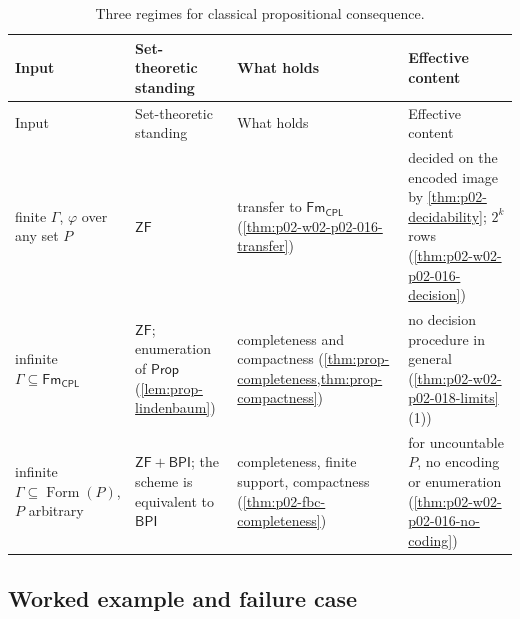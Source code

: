 \begingroup\small
\begin{longtable}{@{}p{}p{}p{}p{}@{}}
\caption{Three regimes for classical propositional consequence.}
\label{tab:p02-w02-p02-016-regimes}\\
\toprule
Input & Set-theoretic standing & What holds & Effective content \\
\midrule\endfirsthead
\toprule
Input & Set-theoretic standing & What holds & Effective content \\
\midrule\endhead
finite \(\Gamma\), \(\varphi\) over any set \(P\)
 & \(\mathsf{ZF}\)
 & transfer to \(\mathsf{Fm}_{\mathsf{CPL}}\)
   (\cref{thm:p02-w02-p02-016-transfer})
 & decided on the encoded image by \cref{thm:p02-decidability};
   \(2^k\) rows (\cref{thm:p02-w02-p02-016-decision}) \\
infinite \(\Gamma\subseteq\mathsf{Fm}_{\mathsf{CPL}}\)
 & \(\mathsf{ZF}\); enumeration of \(\mathsf{Prop}\)
   (\cref{lem:prop-lindenbaum})
 & completeness and compactness
   (\cref{thm:prop-completeness,thm:prop-compactness})
 & no decision procedure in general
   (\cref{thm:p02-w02-p02-018-limits}(1)) \\
infinite \(\Gamma\subseteq\operatorname{Form}(P)\), \(P\) arbitrary
 & \(\mathsf{ZF}+\mathsf{BPI}\); the scheme is equivalent to
   \(\mathsf{BPI}\)
 & completeness, finite support, compactness
   (\cref{thm:p02-fbc-completeness})
 & for uncountable \(P\), no encoding or enumeration
   (\cref{thm:p02-w02-p02-016-no-coding}) \\
\bottomrule
\end{longtable}
\endgroup

\subsection{Worked example and failure case}
\label{sec:p02-w02-p02-016-example}

